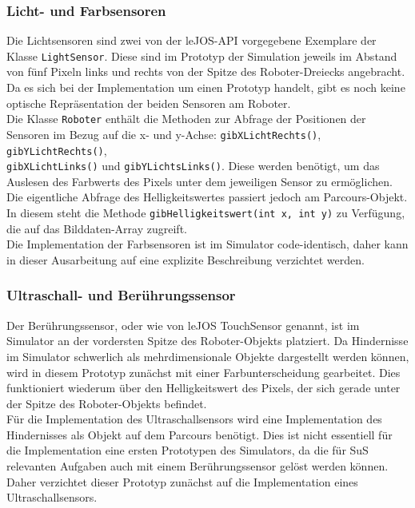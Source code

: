 \documentclass[paper=a4, pagesize, DIV=calc, BCOR=12.5mm, twoside=on, onecolumn=on, open = any, titlepage =on, parskip =half-, headsepline = on, footsepline = on, chapterprefix = on, appendixprefix = off, fontsize = 12pt, numbers = noenddot, abstract = on]{scrbook}
\numberwithin{equation}{chapter}
\theoremstyle{definition}
\theoremstyle{plain}
\theoremstyle{plain}
\theoremstyle{remark}
\theoremstyle{plain}
\theoremstyle{plain}
\begin{document}
\subsubsection{Licht- und Farbsensoren}
Die Lichtsensoren sind zwei von der leJOS-API vorgegebene Exemplare der Klasse \texttt{LightSensor}. Diese sind im Prototyp der Simulation jeweils im Abstand von fünf Pixeln links und rechts von der Spitze des Roboter-Dreiecks angebracht. Da es sich bei der Implementation um einen Prototyp handelt, gibt es noch keine optische Repräsentation der beiden Sensoren am Roboter.\\

Die Klasse \texttt{Roboter} enthält die Methoden zur Abfrage der Positionen der Sensoren im Bezug auf die x- und y-Achse: \texttt{gibXLichtRechts()}, \texttt{gibYLichtRechts()},\\
\texttt{gibXLichtLinks()} und \texttt{gibYLichtsLinks()}. Diese werden benötigt, um das Auslesen des Farbwerts des Pixels unter dem jeweiligen Sensor zu ermöglichen. Die eigentliche Abfrage des Helligkeitswertes passiert jedoch am Parcours-Objekt. In diesem steht die Methode \texttt{gibHelligkeitswert(int x, int y)} zu Verfügung, die auf das Bilddaten-Array zugreift.\\

Die Implementation der Farbsensoren ist im Simulator code-identisch, daher kann in dieser Ausarbeitung auf eine explizite Beschreibung verzichtet werden.
\subsubsection{Ultraschall- und Berührungssensor}
Der Berührungssensor, oder wie von leJOS TouchSensor genannt, ist im Simulator an der vordersten Spitze des Roboter-Objekts platziert. Da Hindernisse im Simulator schwerlich als mehrdimensionale Objekte dargestellt werden können, wird in diesem Prototyp zunächst mit einer Farbunterscheidung gearbeitet. Dies funktioniert wiederum über den Helligkeitswert des Pixels, der sich gerade unter der Spitze des Roboter-Objekts befindet.\\

Für die Implementation des Ultraschallsensors wird eine Implementation des Hindernisses als Objekt auf dem Parcours benötigt. Dies ist nicht essentiell für die Implementation eine ersten Prototypen des Simulators, da die für SuS relevanten Aufgaben auch mit einem Berührungssensor gelöst werden können. Daher verzichtet dieser Prototyp zunächst auf die Implementation eines Ultraschallsensors.
\end{document}

